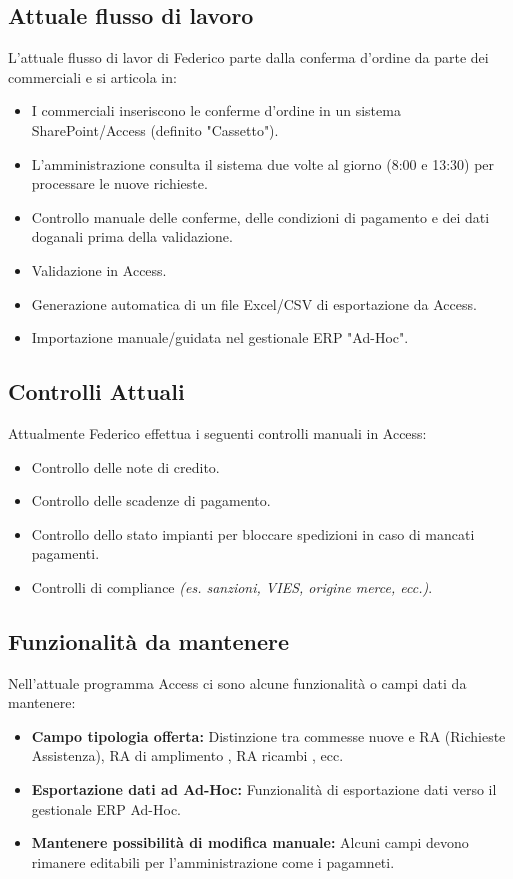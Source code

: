 \documentclass[12pt, a4paper]{article} %
\begin{document}
\subsection{Attuale flusso di lavoro}
L'attuale flusso di lavor di Federico parte dalla conferma d'ordine da parte
dei commerciali e si articola in:
\begin{itemize}
      \item I commerciali inseriscono le conferme d'ordine in un sistema SharePoint/Access
            (definito "Cassetto").
      \item L'amministrazione consulta il sistema due volte al giorno (8:00 e 13:30) per
            processare le nuove richieste.
      \item Controllo manuale delle conferme, delle condizioni di pagamento e dei dati
            doganali prima della validazione.
      \item Validazione in Access.
      \item Generazione automatica di un file Excel/CSV di esportazione da Access.
      \item Importazione manuale/guidata nel gestionale ERP "Ad-Hoc".
\end{itemize}

\subsection{Controlli Attuali}
Attualmente Federico effettua i seguenti controlli manuali in Access:
\begin{itemize}
      \item Controllo delle note di credito.
      \item Controllo delle scadenze di pagamento.
      \item Controllo dello stato impianti per bloccare spedizioni in caso di mancati
            pagamenti.
      \item Controlli di compliance \textit{(es. sanzioni, VIES, origine merce, ecc.)}.
\end{itemize}

\subsection{Funzionalità da mantenere}
Nell'attuale programma Access ci sono alcune funzionalità o campi dati da
mantenere:
\begin{itemize}
      \item \textbf{Campo tipologia offerta:} Distinzione tra commesse nuove e RA (Richieste
            Assistenza), RA di amplimento , RA ricambi , ecc.
      \item \textbf{Esportazione dati ad Ad-Hoc:} Funzionalità di esportazione dati verso il gestionale
            ERP Ad-Hoc.
      \item \textbf{Mantenere possibilità di modifica manuale:} Alcuni campi devono rimanere editabili per l'amministrazione come i pagamneti.
\end{itemize}
\end{document}
